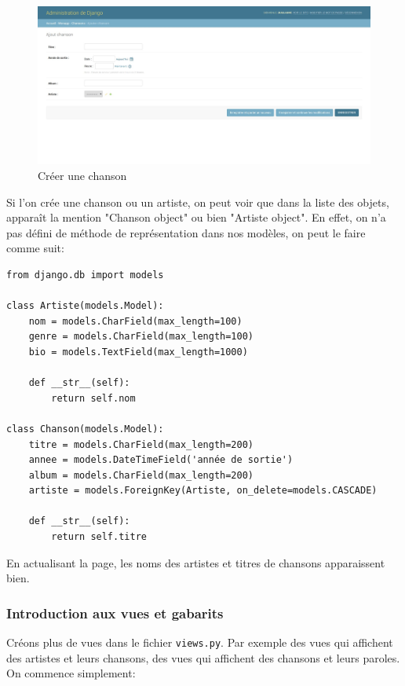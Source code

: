 \documentclass[a4paper, 10pt]{article}
\newcommand{\code}[1]{{\small\texttt{#1}}}
\begin{document}
\begin{figure}[h]
    \begin{center}
        \includegraphics[width=15 cm]{django/admin3.jpg}
        \caption{Créer une chanson}\label{admin3}
    \end{center}
\end{figure}

Si l'on crée une chanson ou un artiste, on peut voir que dans la liste des objets, apparaît la mention "Chanson object" ou bien "Artiste object". En effet, on n'a pas défini de méthode de représentation dans nos modèles, on peut le faire comme suit:
\begin{verbatim}
from django.db import models

class Artiste(models.Model):
    nom = models.CharField(max_length=100)
    genre = models.CharField(max_length=100)
    bio = models.TextField(max_length=1000)

    def __str__(self):
        return self.nom

class Chanson(models.Model):
    titre = models.CharField(max_length=200)
    annee = models.DateTimeField('année de sortie')
    album = models.CharField(max_length=200)
    artiste = models.ForeignKey(Artiste, on_delete=models.CASCADE)

    def __str__(self):
        return self.titre
\end{verbatim}

En actualisant la page, les noms des artistes et titres de chansons apparaissent bien.

\subsubsection{Introduction aux vues et gabarits}
Créons plus de vues dans le fichier \code{views.py}. Par exemple des vues qui affichent des artistes et leurs chansons, des vues qui affichent des chansons et leurs paroles. On commence simplement:
\end{document}
